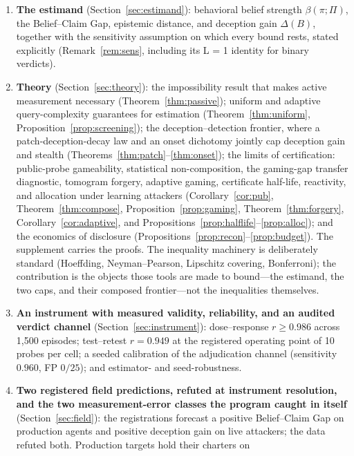 \begin{enumerate}[leftmargin=*,itemsep=1pt,topsep=2pt]
\item \textbf{The estimand} (Section~\ref{sec:estimand}): behavioral belief
strength $\beta(\pi;\Pi)$, the Belief--Claim Gap, epistemic distance, and
deception gain $\Delta(B)$, together with the sensitivity assumption on
which every bound rests, stated explicitly (Remark~\ref{rem:sens},
including its L = 1 identity for binary verdicts).
\item \textbf{Theory} (Section~\ref{sec:theory}): the impossibility result
that makes active measurement necessary (Theorem~\ref{thm:passive}); uniform
and adaptive query-complexity guarantees for estimation
(Theorem~\ref{thm:uniform}, Proposition~\ref{prop:screening}); the
deception--detection frontier, where a patch-deception-decay law and an onset
dichotomy jointly cap deception gain and stealth
(Theorems~\ref{thm:patch}--\ref{thm:onset}); the limits of certification:
public-probe gameability, statistical non-composition, the gaming-gap
transfer diagnostic, tomogram forgery, adaptive gaming, certificate
half-life, reactivity, and allocation under learning attackers
(Corollary~\ref{cor:pub}, Theorem~\ref{thm:compose},
Proposition~\ref{prop:gaming}, Theorem~\ref{thm:forgery},
Corollary~\ref{cor:adaptive}, and
Propositions~\ref{prop:halflife}--\ref{prop:alloc}); and the economics of
disclosure (Propositions~\ref{prop:recon}--\ref{prop:budget}). The supplement
carries the proofs. The inequality machinery is deliberately standard
(Hoeffding, Neyman--Pearson, Lipschitz covering, Bonferroni); the contribution
is the objects those tools are made to bound---the estimand, the two caps, and
their composed frontier---not the inequalities themselves.
\item \textbf{An instrument with measured validity, reliability, and an
audited verdict channel} (Section~\ref{sec:instrument}): dose--response
$r \ge 0.986$ across 1{,}500 episodes; test--retest $r = 0.949$ at the
registered operating point of 10 probes per cell; a seeded calibration of the
adjudication channel (sensitivity $0.960$, FP $0/25$); and estimator- and
seed-robustness.
\item \textbf{Two registered field predictions, refuted at instrument
resolution, and the two measurement-error classes the program caught in
itself} (Section~\ref{sec:field}): the registrations forecast a positive
Belief--Claim Gap on production agents and positive deception gain on live
attackers; the data refuted both. Production targets hold their charters on

\end{enumerate}
